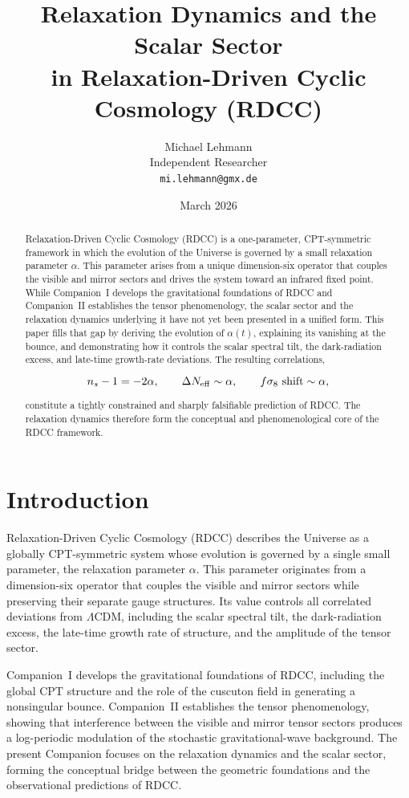 \documentclass[11pt,a4paper]{article}
\title{\textbf{Relaxation Dynamics and the Scalar Sector\\
in Relaxation-Driven Cyclic Cosmology (RDCC)}}
\author{Michael Lehmann \\
        Independent Researcher \\
        \texttt{mi.lehmann@gmx.de}}
\date{March 2026}
\begin{document}
\maketitle

\begin{abstract}
Relaxation-Driven Cyclic Cosmology (RDCC) is a one-parameter, CPT-symmetric framework in which the evolution of the Universe is governed by a small relaxation parameter $\alpha$. This parameter arises from a unique dimension-six operator that couples the visible and mirror sectors and drives the system toward an infrared fixed point. While Companion~I develops the gravitational foundations of RDCC and Companion~II establishes the tensor phenomenology, the scalar sector and the relaxation dynamics underlying it have not yet been presented in a unified form. This paper fills that gap by deriving the evolution of $\alpha(t)$, explaining its vanishing at the bounce, and demonstrating how it controls the scalar spectral tilt, the dark-radiation excess, and late-time growth-rate deviations. The resulting correlations,


\[
n_s - 1 = -2\alpha, \qquad \Delta N_{\rm eff} \sim \alpha, \qquad f\sigma_8 \ \text{shift} \sim \alpha,
\]


constitute a tightly constrained and sharply falsifiable prediction of RDCC. The relaxation dynamics therefore form the conceptual and phenomenological core of the RDCC framework.
\end{abstract}

\tableofcontents
\newpage

\section{Introduction}

Relaxation-Driven Cyclic Cosmology (RDCC) describes the Universe as a globally
CPT-symmetric system whose evolution is governed by a single small parameter, the
relaxation parameter $\alpha$. This parameter originates from a dimension-six operator
that couples the visible and mirror sectors while preserving their separate gauge
structures. Its value controls all correlated deviations from $\Lambda$CDM, including the
scalar spectral tilt, the dark-radiation excess, the late-time growth rate of structure,
and the amplitude of the tensor sector.

Companion~I develops the gravitational foundations of RDCC, including the global
CPT structure and the role of the cuscuton field in generating a nonsingular bounce.
Companion~II establishes the tensor phenomenology, showing that interference between
the visible and mirror tensor sectors produces a log-periodic modulation of the
stochastic gravitational-wave background. The present Companion focuses on the
relaxation dynamics and the scalar sector, forming the conceptual bridge between the
geometric foundations and the observational predictions of RDCC.
\end{document}
